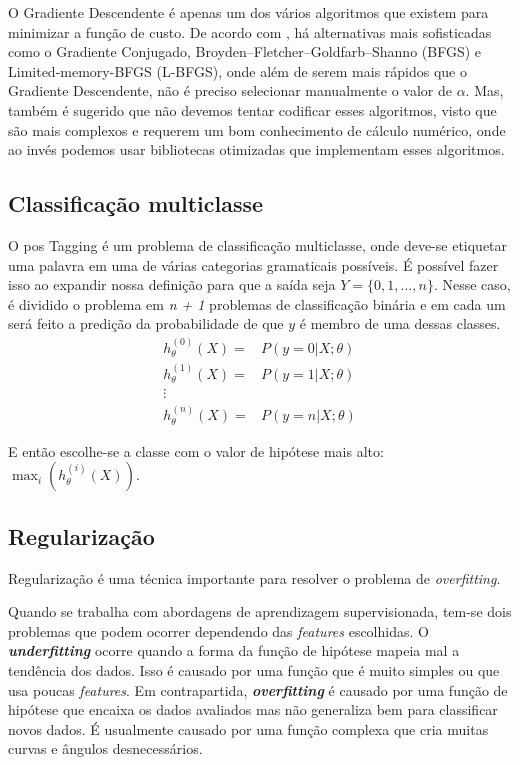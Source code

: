 O Gradiente Descendente é apenas um dos vários algoritmos que existem para minimizar a função de custo. De acordo com , há alternativas mais sofisticadas como o Gradiente Conjugado, Broyden–Fletcher–Goldfarb–Shanno (BFGS) e Limited-memory-BFGS (L-BFGS), onde além de serem mais rápidos que o Gradiente Descendente, não é preciso selecionar manualmente o valor de $\alpha$. Mas, também é sugerido que não devemos tentar codificar esses algoritmos, visto que são mais complexos e requerem um bom conhecimento de cálculo numérico, onde ao invés podemos usar bibliotecas otimizadas que implementam esses algoritmos.


\subsection{Classificação multiclasse}

O \ac{pos} Tagging é um problema de classificação multiclasse, onde deve-se etiquetar uma palavra em uma de várias categorias gramaticais possíveis. É possível fazer isso ao expandir nossa definição para que a saída seja $Y = \{0, 1, ..., n\}$. Nesse caso, é dividido o problema em \textit{n + 1} problemas de classificação binária e em cada um será feito a predição da probabilidade de que $y$ é membro de uma dessas classes.
\begin{align}
h_{\theta}^{(0)}(X) =&  P(y=0 | X ; \theta) \nonumber \\
h_{\theta}^{(1)}(X) =&  P(y=1 | X ; \theta) \nonumber \\
\vdots & \nonumber \\
h_{\theta}^{(n)}(X) =&  P(y=n | X ; \theta) \nonumber
\end{align}

E então escolhe-se a classe com o valor de hipótese mais alto: $ \max_i(h_{\theta}^{(i)}(X)) $.


\subsection{Regularização}\label{subsec:regularizacao}

Regularização é uma técnica importante para resolver o problema de \textit{overfitting}.

Quando se trabalha com abordagens de aprendizagem supervisionada, tem-se dois problemas que podem ocorrer dependendo das \textit{features} escolhidas. O \textbf{\textit{underfitting}} ocorre quando a forma da função de hipótese mapeia mal a tendência dos dados. Isso é causado por uma função que é muito simples ou que usa poucas \textit{features}. Em contrapartida, \textbf{\textit{overfitting}} é causado por uma função de hipótese que encaixa os dados avaliados mas não generaliza bem para classificar novos dados. É usualmente causado por uma função complexa que cria muitas curvas e ângulos desnecessários.

